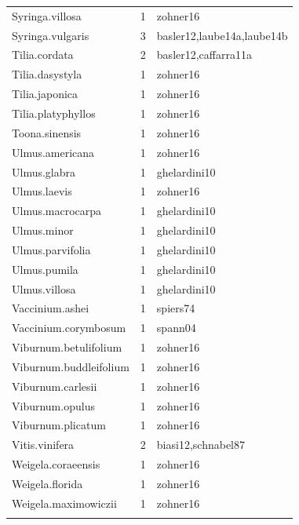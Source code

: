 \documentclass{article}
\begin{document}
\begin{footnotesize}
\begin{longtable}{|p{}|p{}|p{}|}
  Syringa.villosa &   1 & zohner16 \\ 
  Syringa.vulgaris &   3 & basler12,laube14a,laube14b \\ 
  Tilia.cordata &   2 & basler12,caffarra11a \\ 
  Tilia.dasystyla &   1 & zohner16 \\ 
  Tilia.japonica &   1 & zohner16 \\ 
  Tilia.platyphyllos &   1 & zohner16 \\ 
  Toona.sinensis &   1 & zohner16 \\ 
  Ulmus.americana &   1 & zohner16 \\ 
  Ulmus.glabra &   1 & ghelardini10 \\ 
  Ulmus.laevis &   1 & zohner16 \\ 
  Ulmus.macrocarpa &   1 & ghelardini10 \\ 
  Ulmus.minor &   1 & ghelardini10 \\ 
  Ulmus.parvifolia &   1 & ghelardini10 \\ 
  Ulmus.pumila &   1 & ghelardini10 \\ 
  Ulmus.villosa &   1 & ghelardini10 \\ 
  Vaccinium.ashei &   1 & spiers74 \\ 
  Vaccinium.corymbosum &   1 & spann04 \\ 
  Viburnum.betulifolium &   1 & zohner16 \\ 
  Viburnum.buddleifolium &   1 & zohner16 \\ 
  Viburnum.carlesii &   1 & zohner16 \\ 
  Viburnum.opulus &   1 & zohner16 \\ 
  Viburnum.plicatum &   1 & zohner16 \\ 
  Vitis.vinifera &   2 & biasi12,schnabel87 \\ 
  Weigela.coraeensis &   1 & zohner16 \\ 
  Weigela.florida &   1 & zohner16 \\ 
  Weigela.maximowiczii &   1 & zohner16 \\ 
   \hline
\hline
\label{tab:sp}
\end{longtable}
\endgroup



\end{footnotesize}
\end{document}
